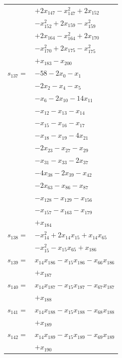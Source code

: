 \begin{longtable}{@{}r@{\;}l@{}}
 & \(\displaystyle +2x_{147} -x_{147}^{2} +2x_{152}\) \\
 & \(\displaystyle -x_{152}^{2} +2x_{159} -x_{159}^{2}\) \\
 & \(\displaystyle +2x_{164} -x_{164}^{2} +2x_{170}\) \\
 & \(\displaystyle -x_{170}^{2} +2x_{175} -x_{175}^{2}\) \\
 & \(\displaystyle +x_{183} -x_{200}\) \\[3pt]
\(s_{137}=\) & \(\displaystyle -58 -2x_{0} -x_{1}\) \\
 & \(\displaystyle -2x_{2} -x_{4} -x_{5}\) \\
 & \(\displaystyle -x_{6} -2x_{10} -14x_{11}\) \\
 & \(\displaystyle -x_{12} -x_{13} -x_{14}\) \\
 & \(\displaystyle -x_{15} -x_{16} -x_{17}\) \\
 & \(\displaystyle -x_{18} -x_{19} -4x_{21}\) \\
 & \(\displaystyle -2x_{23} -x_{27} -x_{29}\) \\
 & \(\displaystyle -x_{31} -x_{33} -2x_{37}\) \\
 & \(\displaystyle -4x_{38} -2x_{39} -x_{42}\) \\
 & \(\displaystyle -2x_{63} -x_{86} -x_{87}\) \\
 & \(\displaystyle -x_{128} -x_{129} -x_{156}\) \\
 & \(\displaystyle -x_{157} -x_{163} -x_{179}\) \\
 & \(\displaystyle +x_{184}\) \\[3pt]
\(s_{138}=\) & \(\displaystyle -x_{14}^{2} +2x_{14}x_{15} +x_{14}x_{65}\) \\
 & \(\displaystyle -x_{15}^{2} -x_{15}x_{65} +x_{186}\) \\[3pt]
\(s_{139}=\) & \(\displaystyle x_{14}x_{186} -x_{15}x_{186} -x_{66}x_{186}\) \\
 & \(\displaystyle +x_{187}\) \\[3pt]
\(s_{140}=\) & \(\displaystyle x_{14}x_{187} -x_{15}x_{187} -x_{67}x_{187}\) \\
 & \(\displaystyle +x_{188}\) \\[3pt]
\(s_{141}=\) & \(\displaystyle x_{14}x_{188} -x_{15}x_{188} -x_{68}x_{188}\) \\
 & \(\displaystyle +x_{189}\) \\[3pt]
\(s_{142}=\) & \(\displaystyle x_{14}x_{189} -x_{15}x_{189} -x_{69}x_{189}\) \\
 & \(\displaystyle +x_{190}\) \\[3pt]

\end{longtable}
